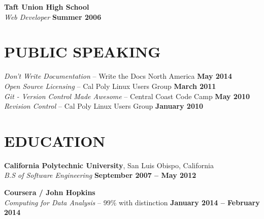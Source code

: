 \documentclass[margin,line]{resume}
\begin{document}
\begin{resume}
    \textbf{\listing Taft Union High School} \vspace{2mm}\\\vspace{1mm}%
    \textsl{Web Developer} \hfill \textbf{Summer 2006}\\

\sectionline

    \section{\mysidestyle \textbf{\large{P}\small{UBLIC SPEAKING}}}

    \textsl{Don't Write Documentation} -- Write the Docs North America \hfill \textbf{May 2014}\\
    \textsl{Open Source Licensing} -- Cal Poly Linux Users Group \hfill \textbf{March 2011}\\
    \textsl{Git - Version Control Made Awesome} -- Central Coast Code Camp \hfill \textbf{May 2010}\\
    \textsl{Revision Control} -- Cal Poly Linux Users Group \hfill \textbf{January 2010}\\

\sectionline

    \section{\mysidestyle \textbf{\large{E}\small{DUCATION}}}

    \textbf{\listing California Polytechnic University}, San Luis Obispo, California \vspace{2mm}\\\vspace{1mm}%
    \textsl{B.S of Software Engineering} \hfill \textbf{September 2007 -- May 2012}\vspace{-3mm}\\\vspace{-1mm}%

    \textbf{\listing Coursera / John Hopkins} \vspace{2mm}\\\vspace{1mm}%
    \textsl{Computing for Data Analysis} -- 99\% with distinction \hfill \textbf{January 2014 -- February 2014}\vspace{-3mm}\\\vspace{-1mm}%


\end{resume}
\end{document}

